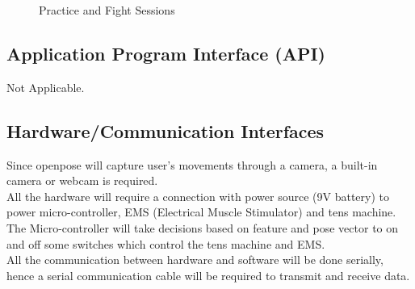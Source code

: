 \begin{figure}[ht]
{  }
  \quad 
  \caption{Practice and Fight Sessions} 
  \centering
  \label{fig:practiceFight}
\end{figure}
\clearpage
\subsection{Application Program Interface (API)}
Not Applicable.
\subsection{Hardware/Communication Interfaces}
Since openpose will capture user's movements through a camera, a built-in camera or webcam is required. 
\\
All the hardware will require a connection with power source (9V battery) to power micro-controller, EMS (Electrical Muscle Stimulator) and tens machine.
\\
The Micro-controller will take decisions based on feature and pose vector to on and off some switches which control the tens machine and EMS.
\\
All the communication between hardware and software will be done serially, hence a serial communication cable will be required to transmit and receive data. 
